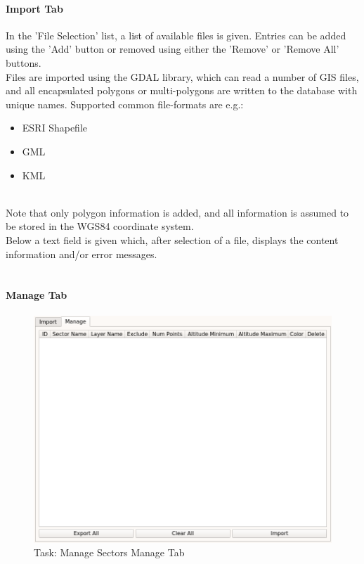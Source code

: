 \paragraph {Import Tab}

In the 'File Selection' list, a list of available files is given. Entries can be added using the 'Add' button or removed using either the 'Remove' or 'Remove All' buttons. \\

Files are imported using the GDAL library, which can read a number of GIS files, and all encapsulated polygons or multi-polygons are written to the database with unique names. Supported common file-formats are e.g.:

\begin{itemize}  
\item ESRI Shapefile
\item GML
\item KML
\end{itemize}
\ \\

Note that only polygon information is added, and all information is assumed to be stored in the WGS84 coordinate system. \\

Below a text field is given which, after selection of a file, displays the content information and/or error messages. \\\

\paragraph {Manage Tab}

\begin{figure}[H]
    \includegraphics[width=16cm,frame]{figures/manage_sectors_manage.png}
  \caption{Task: Manage Sectors Manage Tab}
\end{figure}

